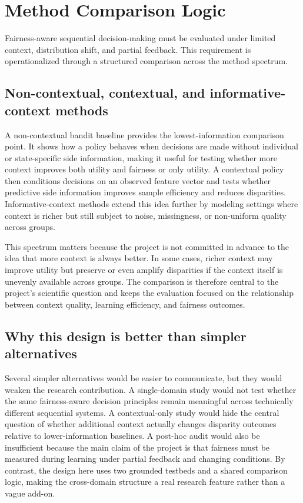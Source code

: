 \documentclass{IEEEtran}
\begin{document}
\section{Method Comparison Logic}
Fairness-aware sequential decision-making must be evaluated under limited
context, distribution shift, and partial feedback. This requirement is
operationalized through a structured comparison across the method spectrum.

\subsection{Non-contextual, contextual, and informative-context methods}
A non-contextual bandit baseline provides the lowest-information comparison
point. It shows how a policy behaves when decisions are made without
individual or state-specific side information, making it useful for testing
whether more context improves both utility and fairness or only utility. A
contextual policy then conditions decisions on an observed feature vector and
tests whether predictive side information improves sample efficiency and
reduces disparities. Informative-context methods extend this idea further by
modeling settings where context is richer but still subject to noise,
missingness, or non-uniform quality across groups.

This spectrum matters because the project is not committed in advance to the
idea that more context is always better. In some cases, richer context may
improve utility but preserve or even amplify disparities if the context
itself is unevenly available across groups. The comparison is therefore
central to the project's scientific question and keeps the evaluation focused
on the relationship between context quality, learning efficiency, and fairness
outcomes.

\subsection{Why this design is better than simpler alternatives}
Several simpler alternatives would be easier to communicate, but they would
weaken the research contribution. A single-domain study would not test
whether the same fairness-aware decision principles remain meaningful across
technically different sequential systems. A contextual-only study would hide
the central question of whether additional context actually changes disparity
outcomes relative to lower-information baselines. A post-hoc audit would also
be insufficient because the main claim of the project is that fairness must
be measured during learning under partial feedback and changing conditions.
By contrast, the design here uses two grounded testbeds and a shared
comparison logic, making the cross-domain structure a real research feature
rather than a vague add-on.
\end{document}
